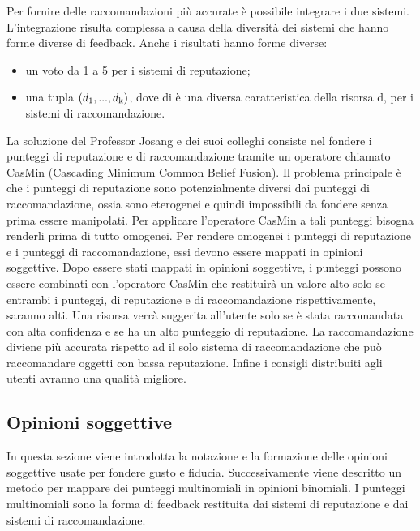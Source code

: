 \documentclass{report}
\begin{document}
	Per fornire delle raccomandazioni più accurate è possibile integrare i
	due sistemi. L'integrazione risulta complessa a causa della diversità
	dei sistemi che hanno forme diverse di feedback. Anche i risultati hanno
	forme diverse:
	
	\begin{itemize}
		\item
		un voto da 1 a 5 per i sistemi di reputazione;
		\item
		una tupla $(d\textsubscript{1}, ... , d\textsubscript{k})$, dove di è una diversa caratteristica della
		risorsa d, per i sistemi di raccomandazione.
	\end{itemize}
	
	La soluzione del Professor Josang e dei suoi colleghi consiste nel
	fondere i punteggi di reputazione e di raccomandazione tramite un
	operatore chiamato CasMin (Cascading Minimum Common Belief Fusion). Il
	problema principale è che i punteggi di reputazione sono potenzialmente
	diversi dai punteggi di raccomandazione, ossia sono eterogenei e quindi
	impossibili da fondere senza prima essere manipolati. Per applicare
	l'operatore CasMin a tali punteggi bisogna renderli prima di tutto
	omogenei. Per rendere omogenei i punteggi di reputazione e i punteggi di
	raccomandazione, essi devono essere mappati in opinioni soggettive. Dopo
	essere stati mappati in opinioni soggettive, i punteggi possono essere
	combinati con l'operatore CasMin che restituirà un valore alto solo se
	entrambi i punteggi, di reputazione e di raccomandazione
	rispettivamente, saranno alti. Una risorsa verrà suggerita all'utente
	solo se è stata raccomandata con alta confidenza e se ha un alto
	punteggio di reputazione. La raccomandazione diviene più accurata
	rispetto ad il solo sistema di raccomandazione che può raccomandare
	oggetti con bassa reputazione. Infine i consigli distribuiti agli utenti
	avranno una qualità migliore.
	
	\hypertarget{header-n47}{%
		\subsection{Opinioni soggettive}\label{header-n47}}
	
	In questa sezione viene introdotta la notazione e la formazione delle
	opinioni soggettive usate per fondere gusto e fiducia. Successivamente
	viene descritto un metodo per mappare dei punteggi multinomiali in
	opinioni binomiali. I punteggi multinomiali sono la forma di feedback
	restituita dai sistemi di reputazione e dai sistemi di raccomandazione.
	
\end{document}
